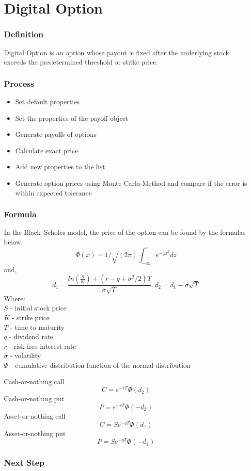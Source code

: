 \documentclass[10pt,Compress]{beamer}
\begin{document}
\section{Digital Option}
\begin{frame}
\frametitle{Definition}
Digital Option is an option whose payout is fixed after the underlying stock exceeds the predetermined threshold or strike price. 
\end{frame}

\begin{frame}
\frametitle{Process}
\begin{itemize}
\item Set default properties
\item Set the properties of the payoff object
\item Generate payoffs of options
\item Calculate exact price
\item Add new properties to the list 
\item Generate option prices using Monte Carlo Method and compare if the error is within expected tolerance
\end{itemize}
\end{frame}

\begin{frame}
\frametitle{Formula}
In the Black–Scholes model, the price of the option can be found by the formulas below.
$$\Phi(x)=1/\sqrt{(2\pi)}\int_{-\infty}^{x}e^{-\frac{1}{2}z^2}dz$$
and,
$$d_1=\frac{ln(\frac{S}{K})+(r-q+\sigma^2/2)T}{\sigma\sqrt{T}}, d_2=d_1-\sigma\sqrt{T}$$
Where:\\
$S$ - initial stock price\\
$K$ - strike price\\
$T$ - time to maturity\\
$q$ - dividend rate\\
$r$ - risk-free interest rate\\
$\sigma$ - volatility\\
$\Phi$ - cumulative distribution function of the normal distribution
\end{frame}

\begin{frame}
Cash-or-nothing call\\
$$C=e^{-rT}\Phi(d_2)$$
Cash-or-nothing put\\
$$P=e^{-rT}\Phi(-d_2)$$
Asset-or-nothing call\\
$$C=Se^{-qT}\Phi(d_1)$$
Asset-or-nothing put\\
$$P=Se^{-qT}\Phi(-d_1)$$
\end{frame}



\begin{frame}
\frametitle{Next Step}

\end{frame}
\end{document}
